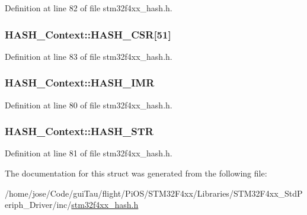 Definition at line 82 of file stm32f4xx\-\_\-hash.\-h.

\hypertarget{struct_h_a_s_h___context_af9b34ce8707c2d48149e0a949d4214cc}{
\subsubsection[{H\-A\-S\-H\-\_\-\-C\-S\-R}]{ H\-A\-S\-H\-\_\-\-Context\-::\-H\-A\-S\-H\-\_\-\-C\-S\-R\mbox{[}51\mbox{]}}}\label{struct_h_a_s_h___context_af9b34ce8707c2d48149e0a949d4214cc}


Definition at line 83 of file stm32f4xx\-\_\-hash.\-h.

\hypertarget{struct_h_a_s_h___context_a1d452257d17957b667b5494293c17e98}{
\subsubsection[{H\-A\-S\-H\-\_\-\-I\-M\-R}]{ H\-A\-S\-H\-\_\-\-Context\-::\-H\-A\-S\-H\-\_\-\-I\-M\-R}}\label{struct_h_a_s_h___context_a1d452257d17957b667b5494293c17e98}


Definition at line 80 of file stm32f4xx\-\_\-hash.\-h.

\hypertarget{struct_h_a_s_h___context_a8b7c5e03086e4a4a4a2c2ab55242f280}{
\subsubsection[{H\-A\-S\-H\-\_\-\-S\-T\-R}]{ H\-A\-S\-H\-\_\-\-Context\-::\-H\-A\-S\-H\-\_\-\-S\-T\-R}}\label{struct_h_a_s_h___context_a8b7c5e03086e4a4a4a2c2ab55242f280}


Definition at line 81 of file stm32f4xx\-\_\-hash.\-h.



The documentation for this struct was generated from the following file\-:\begin{DoxyCompactItemize}
\item 
/home/jose/\-Code/gui\-Tau/flight/\-Pi\-O\-S/\-S\-T\-M32\-F4xx/\-Libraries/\-S\-T\-M32\-F4xx\-\_\-\-Std\-Periph\-\_\-\-Driver/inc/\hyperlink{stm32f4xx__hash_8h}{stm32f4xx\-\_\-hash.\-h}\end{DoxyCompactItemize}
